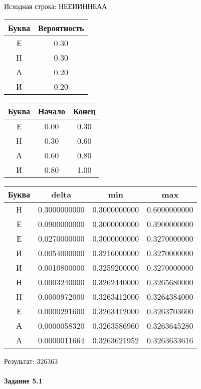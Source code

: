 \documentclass[a4paper, 12pt]{article}
\begin{document}
Исходная строка: НЕЕИИННЕАА\
\begin{center}
 \begin{tabular}{ |c|c| } 
  \hline
     Буква & Вероятность \\ \hline
Е & 0.30\\\hline
Н & 0.30\\\hline
А & 0.20\\\hline
И & 0.20
\\ \hline \end{tabular}
\end{center}
\begin{center}
 \begin{tabular}{ |c|c|c| } 
  \hline
     Буква & Начало & Конец \\ \hline
Е & 0.00 & 0.30\\\hline
Н & 0.30 & 0.60\\\hline
А & 0.60 & 0.80\\\hline
И & 0.80 & 1.00
\\ \hline \end{tabular}
\end{center}
\begin{center}
 \begin{tabular}{ |c|c|c|c| } 
  \hline
     Буква & delta & min & max \\ \hline
Н & 0.3000000000 & 0.3000000000 & 0.6000000000\\\hline
Е & 0.0900000000 & 0.3000000000 & 0.3900000000\\\hline
Е & 0.0270000000 & 0.3000000000 & 0.3270000000\\\hline
И & 0.0054000000 & 0.3216000000 & 0.3270000000\\\hline
И & 0.0010800000 & 0.3259200000 & 0.3270000000\\\hline
Н & 0.0003240000 & 0.3262440000 & 0.3265680000\\\hline
Н & 0.0000972000 & 0.3263412000 & 0.3264384000\\\hline
Е & 0.0000291600 & 0.3263412000 & 0.3263703600\\\hline
А & 0.0000058320 & 0.3263586960 & 0.3263645280\\\hline
А & 0.0000011664 & 0.3263621952 & 0.3263633616
\\ \hline \end{tabular}
\end{center}
Результат: 326363
\pagebreak
\paragraph{Задание 5.1}
\end{document}

